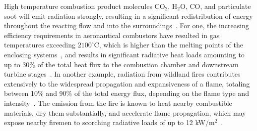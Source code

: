 High temperature combustion product molecules CO$_2$, H$_2$O, CO, and particulate soot will emit radiation strongly, resulting in a significant redistribution of energy throughout the reacting flow and into the surroundings~\cite{Modest2022ChapterSystems}. 
For one, the increasing efficiency requirements in aeronautical combustors have resulted in gas temperatures exceeding $2100^{\circ}$C, which is higher than the melting points of the enclosing systems~\cite{Lefebvre2010GasCombustion}, and results in significant radiative heat loads amounting to up to $30$\% of the total heat flux to the combustion chamber and downstream turbine stages~\cite{Lefebvre1984FlameChambers,Flamant2019OpportunitiesCoatings}.
In another example, radiation from wildland fires contributes extensively to the widespread propagation and expansiveness of a flame, totaling between 10\% and 90\% of the total energy flux, depending on the flame type and intensity~\cite{Westerling2016IncreasingSpring,Valendik2008EffectEnvironment,Sacadura2005RadiativeScience}. 
The emission from the fire is known to heat nearby combustible materials, dry them substantially, and accelerate flame propagation, which may expose nearby firemen to scorching radiative loads of up to 12 kW/m$^2$~\cite{Valendik2008EffectEnvironment}.

